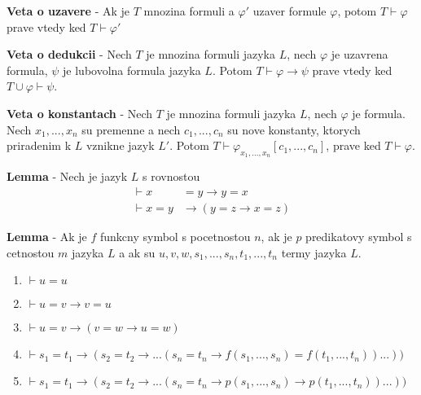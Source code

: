 \documentclass[12pt]{article}
\begin{document}
\textbf{Veta o uzavere} - Ak je $T$ mnozina formuli a $\varphi'$ uzaver formule $\varphi$,
potom $T \vdash \varphi$ prave vtedy ked $T \vdash \varphi'$

\textbf{Veta o dedukcii} - Nech $T$ je mnozina formuli jazyka $L$, nech $\varphi$ je uzavrena
formula, $\psi$ je lubovolna formula jazyka $L$. Potom $T \vdash \varphi \to \psi$ prave vtedy
ked $T \cup \varphi \vdash \psi$.

\textbf{Veta o konstantach} - Nech $T$ je mnozina formuli jazyka $L$, nech $\varphi$ je formula.
Nech $x_{1},...,x_{n}$ su premenne a nech $c_{1},...,c_{n}$ su nove konstanty, ktorych priradenim
k $L$ vznikne jazyk $L'$. Potom $T \vdash \varphi_{x_{1},...,x_{n}}[c_{1},...,c_{n}]$, prave ked
$T \vdash \varphi$.

\textbf{Lemma} - Nech je jazyk $L$ s rovnostou
\begin{align*}
	\vdash x &= y \to y = x \\
	\vdash x = y &\to (y = z \to x = z)
\end{align*}

\textbf{Lemma} - Ak je $f$ funkcny symbol s pocetnostou $n$, ak je $p$ predikatovy symbol
s cetnostou $m$ jazyka $L$ a ak su $u,v,w,s_{1},...,s_{n},t_{1},...,t_{n}$ termy jazyka $L$.
\begin{enumerate}
	\item $\vdash u = u$
	\item $\vdash u = v \to v = u$
	\item $\vdash u = v \to (v = w \to u = w)$
	\item $\vdash s_{1} = t_{1} \to (s_{2} = t_{2} \to ... (s_{n} = t_{n} \to
		f(s_{1},...,s_{n}) = f(t_{1},...,t_{n}))...))$
	\item $\vdash s_{1} = t_{1} \to (s_{2} = t_{2} \to ... (s_{n} = t_{n} \to
		p(s_{1},...,s_{n}) \to p(t_{1},...,t_{n}))...))$
\end{enumerate}
\end{document}
